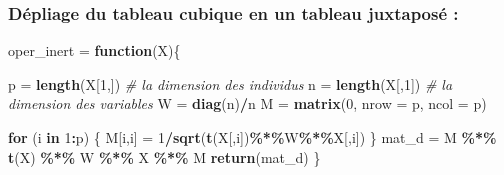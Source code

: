 \documentclass[
]{article}
\newenvironment{Shaded}{\begin{snugshade}}{\end{snugshade}}
\newcommand{\AttributeTok}[1]{\textcolor[rgb]{0.13,0.29,0.53}{#1}}
\newcommand{\CommentTok}[1]{\textcolor[rgb]{0.56,0.35,0.01}{\textit{#1}}}
\newcommand{\ControlFlowTok}[1]{\textcolor[rgb]{0.13,0.29,0.53}{\textbf{#1}}}
\newcommand{\DecValTok}[1]{\textcolor[rgb]{0.00,0.00,0.81}{#1}}
\newcommand{\FunctionTok}[1]{\textcolor[rgb]{0.13,0.29,0.53}{\textbf{#1}}}
\newcommand{\NormalTok}[1]{#1}
\newcommand{\OtherTok}[1]{\textcolor[rgb]{0.56,0.35,0.01}{#1}}
\newcommand{\SpecialCharTok}[1]{\textcolor[rgb]{0.81,0.36,0.00}{\textbf{#1}}}
\begin{document}
\begin{Shaded}
\end{Shaded}

\hypertarget{duxe9pliage-du-tableau-cubique-en-un-tableau-juxtaposuxe9}{%
\subsubsection{Dépliage du tableau cubique en un tableau juxtaposé
:}\label{duxe9pliage-du-tableau-cubique-en-un-tableau-juxtaposuxe9}}

\begin{Shaded}
\begin{Highlighting}[]
\NormalTok{oper\_inert }\OtherTok{=} \ControlFlowTok{function}\NormalTok{(X)\{}
  
\NormalTok{  p }\OtherTok{=} \FunctionTok{length}\NormalTok{(X[}\DecValTok{1}\NormalTok{,]) }\CommentTok{\# la dimension des individus}
\NormalTok{  n }\OtherTok{=} \FunctionTok{length}\NormalTok{(X[,}\DecValTok{1}\NormalTok{]) }\CommentTok{\# la dimension des variables}
\NormalTok{  W }\OtherTok{=} \FunctionTok{diag}\NormalTok{(n)}\SpecialCharTok{/}\NormalTok{n}
\NormalTok{  M }\OtherTok{=} \FunctionTok{matrix}\NormalTok{(}\DecValTok{0}\NormalTok{, }\AttributeTok{nrow =}\NormalTok{ p, }\AttributeTok{ncol =}\NormalTok{ p)}
  
  \ControlFlowTok{for}\NormalTok{ (i }\ControlFlowTok{in} \DecValTok{1}\SpecialCharTok{:}\NormalTok{p) \{}
\NormalTok{    M[i,i] }\OtherTok{=} \DecValTok{1}\SpecialCharTok{/}\FunctionTok{sqrt}\NormalTok{(}\FunctionTok{t}\NormalTok{(X[,i])}\SpecialCharTok{\%*\%}\NormalTok{W}\SpecialCharTok{\%*\%}\NormalTok{X[,i])}
\NormalTok{  \}}
\NormalTok{  mat\_d }\OtherTok{=}\NormalTok{ M }\SpecialCharTok{\%*\%} \FunctionTok{t}\NormalTok{(X) }\SpecialCharTok{\%*\%}\NormalTok{ W }\SpecialCharTok{\%*\%}\NormalTok{ X }\SpecialCharTok{\%*\%}\NormalTok{ M}
  \FunctionTok{return}\NormalTok{(mat\_d)}
\NormalTok{\}}
\end{Highlighting}
\end{Shaded}
\end{document}
